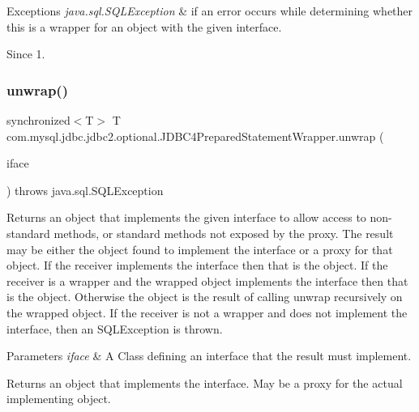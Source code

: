 \begin{DoxyExceptions}{Exceptions}
{\em java.\+sql.\+S\+Q\+L\+Exception} & if an error occurs while determining whether this is a wrapper for an object with the given interface. \\
\hline
\end{DoxyExceptions}
\begin{DoxySince}{Since}
1. 
\end{DoxySince}
\mbox{\label{classcom_1_1mysql_1_1jdbc_1_1jdbc2_1_1optional_1_1_j_d_b_c4_prepared_statement_wrapper_ad0e4c0a8f55780588767fc38546217f3}} 
\subsubsection{\texorpdfstring{unwrap()}{unwrap()}}
{\footnotesize\ttfamily synchronized$<$T$>$ T com.\+mysql.\+jdbc.\+jdbc2.\+optional.\+J\+D\+B\+C4\+Prepared\+Statement\+Wrapper.\+unwrap (\begin{DoxyParamCaption}\item[{java.\+lang.\+Class$<$ T $>$}]{iface }\end{DoxyParamCaption}) throws java.\+sql.\+S\+Q\+L\+Exception}

Returns an object that implements the given interface to allow access to non-\/standard methods, or standard methods not exposed by the proxy. The result may be either the object found to implement the interface or a proxy for that object. If the receiver implements the interface then that is the object. If the receiver is a wrapper and the wrapped object implements the interface then that is the object. Otherwise the object is the result of calling {\ttfamily unwrap} recursively on the wrapped object. If the receiver is not a wrapper and does not implement the interface, then an {\ttfamily S\+Q\+L\+Exception} is thrown.


\begin{DoxyParams}{Parameters}
{\em iface} & A Class defining an interface that the result must implement. \\
\hline
\end{DoxyParams}
\begin{DoxyReturn}{Returns}
an object that implements the interface. May be a proxy for the actual implementing object. 
\end{DoxyReturn}

